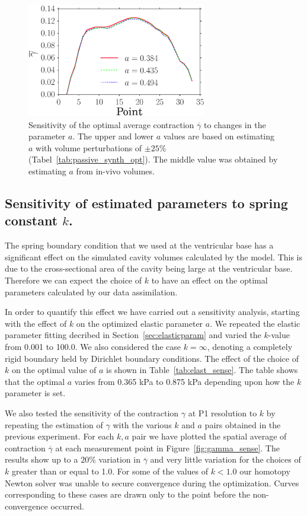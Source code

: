 \begin{figure}[t]
\includegraphics[width=0.7\textwidth]{mean_gamma_material_parameters_fixed}
\caption{Sensitivity of the optimal average contraction $\overline{\gamma}$ to changes in the parameter $a$. The upper and lower $a$
values are based on estimating $a$ with volume perturbations of $\pm 25 \% $ (Tabel~\ref{tab:passive_synth_opt}). The middle
 value was obtained by estimating $a$ from in-vivo volumes.}
\label{fig:gamma_sense_mat}
\end{figure}


\subsection{Sensitivity of estimated parameters to spring constant $k$.}
\label{sec:k_sense}
The spring boundary condition that we used at the ventricular base has a significant
effect on the simulated cavity volumes calculated by the model. This is due to the 
cross-sectional area of the cavity being large at the ventricular base. Therefore 
we can expect the choice of $k$ to have an effect on the optimal parameters calculated 
by our data assimilation. 

In order to quantify this effect we have
carried out a sensitivity analysis, starting with the effect of $k$ on the optimized elastic parameter $a$.
We repeated the elastic parameter fitting decribed in Section~\ref{sec:elasticparam} and varied the $k$-value from 0.001 to 100.0.
We also considered the case $k = \infty$, denoting a completely rigid boundary held by
Dirichlet boundary conditions. The effect of the choice of $k$ on the
optimal value of $a$ is shown in Table~\ref{tab:elast_sense}. The
table shows that the optimal $a$ varies from 0.365 kPa to 0.875 kPa depending upon how the $k$ parameter is set. 

We also tested the sensitivity of the contraction $\gamma$ at P1 resolution to $k$ by
repeating the estimation of $\gamma$ with the various $k$ and $a$ pairs obtained in the
previous experiment. For each $k, a$ pair we have plotted the spatial average of contraction $\overline{\gamma}$
at each measurement point in Figure~\ref{fig:gamma_sense}. The results
show up to a $20 \%$ variation in $\overline{\gamma}$ and
very little variation for the choices of $k$ greater than or equal to
1.0. For some of the values of $k < 1.0$ our homotopy Newton solver was unable to 
secure convergence during the optimization. Curves corresponding to
these cases are drawn only to the point before the non-convergence occurred.



